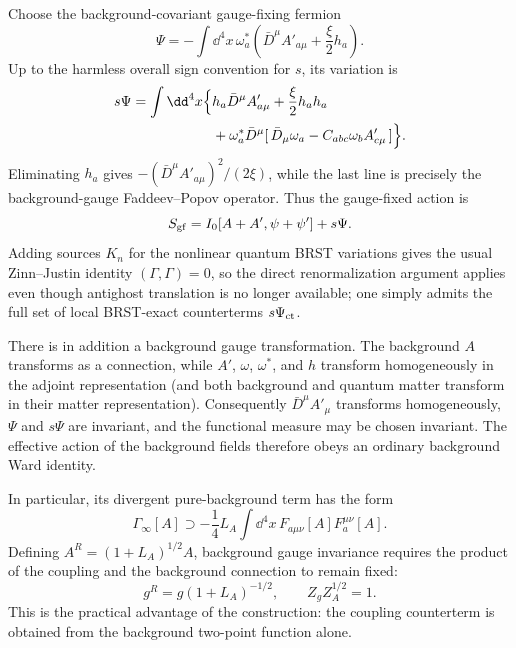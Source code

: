 \begin{enumerate}
  Choose the background-covariant gauge-fixing fermion
  \[
    \Psi=-\int \dd^4x\,\omega_a^*
       \left(\bar D^\mu A'_{a\mu}+\frac{\xi}{2}h_a\right).
  \]
  Up to the harmless overall sign convention for \(s\), its variation is
  \[
  \begin{split}
    s\Psi=\int \dd^4x\Bigl\{&
       h_a\bar D^\mu A'_{a\mu}
       +\frac{\xi}{2}h_a h_a\\
       &+\omega_a^*\bar D^\mu
       [\,\bar D_\mu\omega_a
          -C_{abc}\omega_b A'_{c\mu}\,]
       \Bigr\}.
  \end{split}
  \]
  Eliminating \(h_a\) gives
  \(-(\bar D^\mu A'_{a\mu})^2/(2\xi)\), while the last line is
  precisely the background-gauge Faddeev--Popov operator.  Thus the
  gauge-fixed action is
  \[
    S_{\rm gf}=I_0[A+A',\psi+\psi']+s\Psi .
  \]
  Adding sources \(K_n\) for the nonlinear quantum BRST variations gives
  the usual Zinn--Justin identity \((\Gamma,\Gamma)=0\), so the direct
  renormalization argument applies even though antighost translation is
  no longer available; one simply admits the full set of local
  BRST-exact counterterms \(s\Psi_{\rm ct}\).

  There is in addition a background gauge transformation.  The
  background \(A\) transforms as a connection, while
  \(A'\), \(\omega\), \(\omega^*\), and \(h\) transform homogeneously in
  the adjoint representation (and both background and quantum matter
  transform in their matter representation).  Consequently
  \(\bar D^\mu A'_\mu\) transforms homogeneously, \(\Psi\) and \(s\Psi\)
  are invariant, and the functional measure may be chosen invariant.
  The effective action of the background fields therefore obeys an
  ordinary background Ward identity.

  In particular, its divergent pure-background term has the form
  \[
    \Gamma_\infty[A]\supset
      -\frac14L_A\int \dd^4x\,
       F_{a\mu\nu}[A]F_a^{\mu\nu}[A].
  \]
  Defining \(A^R=(1+L_A)^{1/2}A\), background gauge invariance requires
  the product of the coupling and the background connection to remain
  fixed:
  \[
    g^R=g(1+L_A)^{-1/2},
    \qquad Z_gZ_A^{1/2}=1 .
  \]
  This is the practical advantage of the construction: the coupling
  counterterm is obtained from the background two-point function alone.


\end{enumerate}
